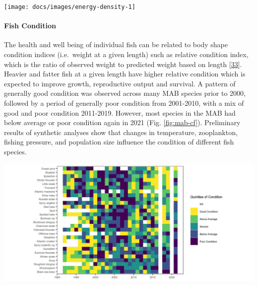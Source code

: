 \documentclass[
  10pt,
]{article}
\let\origfigure\figure
\let\endorigfigure\endfigure
\renewenvironment{figure}[1][2] {
    \expandafter\origfigure\expandafter[H]
} {
    \endorigfigure
}
\begin{document}
\begin{figure}

{\centering \texttt{[image: docs/images/energy-density-1]} 

}

\caption{Forage fish mean energy density mean and standard deviation by season and year, compared with 1980s (solid line; Steimle and Terranove 1985) and 1990s (dashed line; Lawson et al. 1998) values.}\label{fig:energy-density}
\end{figure}

\hypertarget{fish-condition}{%
\paragraph{Fish Condition}\label{fish-condition}}

The health and well being of individual fish can be related to body
shape condition indices (i.e.~weight at a given length) such as relative
condition index, which is the ratio of observed weight to predicted
weight based on length
{[}\protect\hyperlink{ref-le_cren_length-weight_1951}{33}{]}. Heavier
and fatter fish at a given length have higher relative condition which
is expected to improve growth, reproductive output and survival. A
pattern of generally good condition was observed across many MAB species
prior to 2000, followed by a period of generally poor condition from
2001-2010, with a mix of good and poor condition 2011-2019. However,
most species in the MAB had below average or poor condition again in
2021 (Fig. \ref{fig:mab-cf}). Preliminary results of synthetic analyses
show that changes in temperature, zooplankton, fishing pressure, and
population size influence the condition of different fish species.

\begin{figure}

{\centering \includegraphics[width=1\linewidth]{images/MAB_Condition_allsex_2022_viridis} 

}

\caption{Condition factor for fish species in the MAB based on fall NEFSC bottom trawl survey data. MAB data are missing for 2017 due to survey delays, and no survey was conducted in 2020.}\label{fig:mab-cf}
\end{figure}
\end{document}
